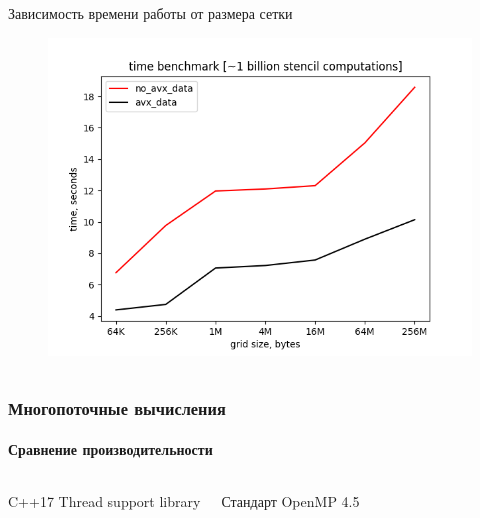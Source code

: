 \documentclass[presentation,18pt]{beamer}
\begin{document}
\begin{frame}[t]
\begin{columns}
		\begin{alertblock}{Зависимость времени работы от размера сетки}
			\begin{figure}
				\includegraphics[width=\textwidth]{img/GraphAVX.png}
			\end{figure}
		\end{alertblock}

	\end{columns}
\end{frame}

\begin{frame}[t]
	\label{multithread}
	\frametitle{Многопоточные вычисления}
	\framesubtitle{Сравнение производительности}

	\begin{columns}

		\begin{block}{C++17 Thread support library}
			\vspace{150pt}
		\end{block}

		\begin{block}{Стандарт OpenMP 4.5}
			\vspace{150pt}
		\end{block}

	\end{columns}
\end{frame}

\end{document}
